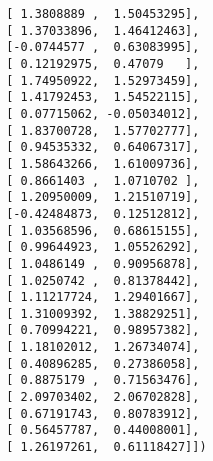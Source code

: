 \documentclass[a4paper,10pt]{article}
\begin{document}
\begin{verbatim}
       [ 1.3808889 ,  1.50453295],
       [ 1.37033896,  1.46412463],
       [-0.0744577 ,  0.63083995],
       [ 0.12192975,  0.47079   ],
       [ 1.74950922,  1.52973459],
       [ 1.41792453,  1.54522115],
       [ 0.07715062, -0.05034012],
       [ 1.83700728,  1.57702777],
       [ 0.94535332,  0.64067317],
       [ 1.58643266,  1.61009736],
       [ 0.8661403 ,  1.0710702 ],
       [ 1.20950009,  1.21510719],
       [-0.42484873,  0.12512812],
       [ 1.03568596,  0.68615155],
       [ 0.99644923,  1.05526292],
       [ 1.0486149 ,  0.90956878],
       [ 1.0250742 ,  0.81378442],
       [ 1.11217724,  1.29401667],
       [ 1.31009392,  1.38829251],
       [ 0.70994221,  0.98957382],
       [ 1.18102012,  1.26734074],
       [ 0.40896285,  0.27386058],
       [ 0.8875179 ,  0.71563476],
       [ 2.09703402,  2.06702828],
       [ 0.67191743,  0.80783912],
       [ 0.56457787,  0.44008001],
       [ 1.26197261,  0.61118427]])
\end{verbatim}

\begin{comment}
\begin{figure}[H]
	\centering
	\begin{subfigure}{0.45\textwidth}
  		\centering
  		\texttt{[image: ../week4/images/prob41asurf.png]}
  		\caption{$x=(0,-1)$}
  \end{subfigure}
  \begin{subfigure}{0.45\textwidth}
  		\centering
  		\texttt{[image: ../week4/images/prob41bsurf.png]}
  		\caption{$x=(0,0.05)$}
  \end{subfigure}
  	\caption{Surface plots of $m(p)$ at different points}
\end{figure}
\end{comment}
\end{document}
